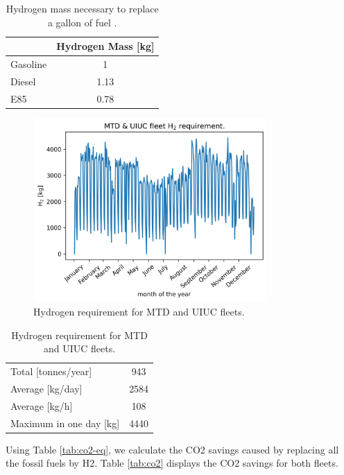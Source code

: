 \documentclass[11pt,letterpaper]{article}
\begin{document}
	\begin{table}[htbp!]
	\centering
	\caption{Hydrogen mass necessary to replace a gallon of fuel \cite{doe_office_of_energy_efficiency_and_renewable_energy_hydrogen_2020} \cite{alternative_fuels_data_center_fuel_2014}.}
	\begin{tabular}{|l|c|}
	    \hline
	 	                 & Hydrogen Mass [kg] \\ \hline
	 	Gasoline         & 1                  \\
	 	Diesel           & 1.13               \\
	 	E85              & 0.78               \\ \hline
	\end{tabular}
	\label{tab:equiv}
	\end{table}

	\begin{figure}[htbp!]
	    \centering
		\includegraphics[height=7.0cm]{figures/hydro-fleet}
		\hfill
		\caption{Hydrogen requirement for MTD and UIUC fleets.}
		\label{fig:hydro-fleet}
	\end{figure}

	\begin{table}[htbp!]
		\centering
	    \caption{Hydrogen requirement for MTD and UIUC fleets.}
		\begin{tabular}{|l|c|}
		\hline
		Total [tonnes/year]     & 943    \\
		Average [kg/day] 	    & 2584   \\
		Average [kg/h] 		    & 108    \\
		Maximum in one day [kg] & 4440   \\ \hline
        \end{tabular}
        \label{tab:hydro-fleet}
	\end{table}

Using Table \ref{tab:co2-eq}, we calculate the \gls{CO2} savings caused by replacing all the fossil fuels by \gls{H2}.
Table \ref{tab:co2} displays the \gls{CO2} savings for both fleets.
\end{document}
